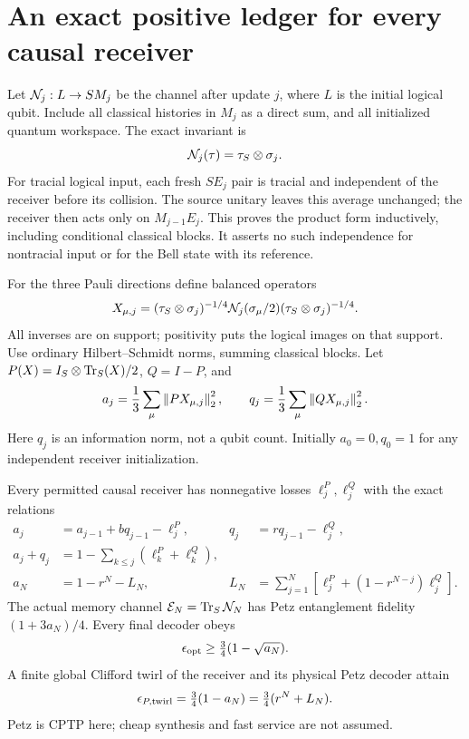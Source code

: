 \section{An exact positive ledger for every causal receiver}

Let $\mathcal N_j:L\to SM_j$ be the channel after update $j$, where $L$ is the initial
logical qubit. Include all classical histories in $M_j$ as a direct sum, and all
initialized quantum workspace. The exact invariant is
\begin{equation}
 \mathcal N_j(\tau)=\tau_S\otimes\sigma_j.\label{eq:baseline}
\end{equation}
For tracial logical input, each fresh $SE_j$ pair is tracial and independent of
the receiver before its collision. The source unitary leaves this average
unchanged; the receiver then acts only on $M_{j-1}E_j$. This proves the product
form inductively, including conditional classical blocks. It asserts no such
independence for nontracial input or for the Bell state with its reference.

For the three Pauli directions define balanced operators
\[
 X_{\mu,j}=(\tau_S\otimes\sigma_j)^{-1/4}\mathcal N_j(\sigma_\mu/2)
 (\tau_S\otimes\sigma_j)^{-1/4}.
\]
All inverses are on support; positivity puts the logical images on that
support. Use ordinary Hilbert--Schmidt norms, summing classical blocks. Let
$P(X)=I_S\otimes\operatorname{Tr}_S(X)/2$, $Q=I-P$, and
\[
 a_j=\frac13\sum_\mu\left\lVert PX_{\mu,j}\right\rVert_2^2,\qquad
 q_j=\frac13\sum_\mu\left\lVert QX_{\mu,j}\right\rVert_2^2.
\]
Here $q_j$ is an information norm, not a qubit count. Initially $a_0=0,q_0=1$
for any independent receiver initialization.

\begin{theorem}
Every permitted causal receiver has nonnegative losses $\ell_j^P,\ell_j^Q$
with the exact relations
\begin{align}
 a_j&=a_{j-1}+bq_{j-1}-\ell_j^P,&q_j&=rq_{j-1}-\ell_j^Q,\\
 a_j+q_j&=1-\sum_{k\le j}(\ell_k^P+\ell_k^Q),\nonumber\\
 a_N&=1-r^N-L_N,&
 L_N&=\sum_{j=1}^N[\ell_j^P+(1-r^{N-j})\ell_j^Q].\label{eq:ledger}
\end{align}
The actual memory channel $\mathcal E_N=\operatorname{Tr}_S\mathcal N_N$ has Petz entanglement
fidelity $(1+3a_N)/4$. Every final decoder obeys
\begin{equation}
 \epsilon_{\rm opt}\ge\tfrac34(1-\sqrt{a_N}).\label{eq:lowera}
\end{equation}
A finite global Clifford twirl of the receiver and its physical Petz decoder
attain
\begin{equation}
 \epsilon_{P,\rm twirl}=\tfrac34(1-a_N)=\tfrac34(r^N+L_N).\label{eq:attained}
\end{equation}
Petz is CPTP here; cheap synthesis and fast service are not assumed.
\end{theorem}


